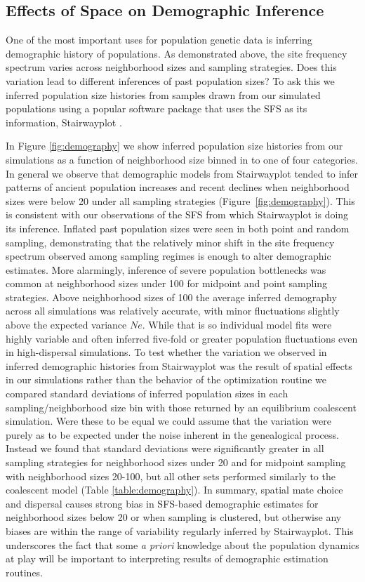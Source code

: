 \documentclass[11pt,twoside,lineno]{preprint}
\begin{document}
\subsection{Effects of Space on Demographic Inference}
One of the most important uses for population genetic data is inferring demographic history of populations. As demonstrated above, the site frequency spectrum varies across neighborhood sizes and sampling strategies. Does this variation lead to different inferences of past population sizes? To ask this we inferred population size histories from samples drawn from our simulated populations using a popular software package that uses the SFS as its information, Stairwayplot \citep{Liu2015}.

In Figure \ref{fig:demography} we show inferred population size histories from our simulations as a function of neighborhood size binned in to one of four categories. In general we observe that demographic models from Stairwayplot tended to infer patterns of ancient population increases and recent declines when neighborhood sizes were below 20 under all sampling strategies (Figure~\ref{fig:demography}). This is consistent with our observations of the SFS from which Stairwayplot is doing its inference. Inflated past population sizes were seen in both point and random sampling, demonstrating that the relatively minor shift in the site frequency spectrum observed among sampling regimes is enough to alter demographic estimates. More alarmingly, inference of severe population bottlenecks was  common at neighborhood sizes under 100 for midpoint and point sampling strategies. Above neighborhood sizes of 100 the average inferred demography across all simulations was relatively accurate, with minor fluctuations slightly above the expected variance $Ne$. While that is so individual model fits were highly variable and often inferred five-fold or greater population fluctuations even in high-dispersal simulations.  
To test whether the variation we observed in inferred demographic histories from Stairwayplot was the result of spatial effects in our simulations rather than the behavior of the optimization routine we compared standard deviations of inferred population sizes in each sampling/neighborhood size bin with those returned by an equilibrium coalescent simulation. Were these to be equal we could assume that the variation were purely as to be expected under the noise inherent in the genealogical process. Instead we found that standard deviations were significantly greater in all sampling strategies for neighborhood sizes under 20 and for midpoint sampling with neighborhood sizes 20-100, but all other sets performed similarly to the coalescent model (Table \ref{table:demography}). In summary, spatial mate choice and dispersal causes strong bias in SFS-based demographic estimates for neighborhood sizes below 20 or when sampling is clustered, but otherwise any biases are within the range of variability regularly inferred by Stairwayplot. This underscores the fact that some \textit{a priori} knowledge about the population dynamics at play will be important to interpreting results of demographic estimation routines. 
\end{document}
